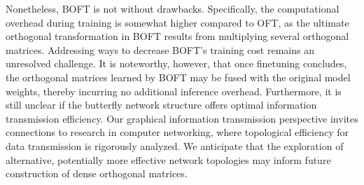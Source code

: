 Nonetheless, BOFT is not without drawbacks. Specifically, the computational overhead during training is somewhat higher compared to OFT, as the ultimate orthogonal transformation in BOFT results from multiplying several orthogonal matrices. Addressing ways to decrease BOFT’s training cost remains an unresolved challenge. It is noteworthy, however, that once finetuning concludes, the orthogonal matrices learned by BOFT may be fused with the original model weights, thereby incurring no additional inference overhead. Furthermore, it is still unclear if the butterfly network structure offers optimal information transmission efficiency. Our graphical information transmission perspective invites connections to research in computer networking, where topological efficiency for data transmission is rigorously analyzed. We anticipate that the exploration of alternative, potentially more effective network topologies may inform future construction of dense orthogonal matrices.

